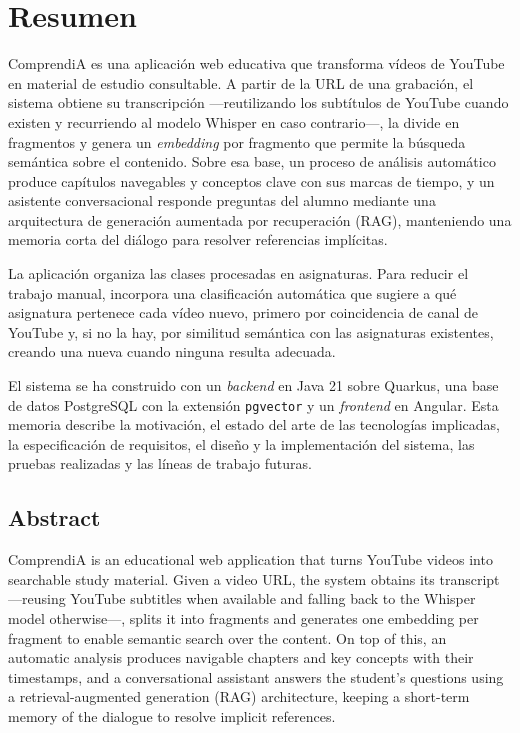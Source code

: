 \cleardoublepage
\chapter*{Resumen}

ComprendiA es una aplicación web educativa que transforma vídeos de YouTube en material
de estudio consultable. A partir de la URL de una grabación, el sistema obtiene su
transcripción —reutilizando los subtítulos de YouTube cuando existen y recurriendo al
modelo Whisper en caso contrario—, la divide en fragmentos y genera un \textit{embedding}
por fragmento que permite la búsqueda semántica sobre el contenido. Sobre esa base, un
proceso de análisis automático produce capítulos navegables y conceptos clave con sus
marcas de tiempo, y un asistente conversacional responde preguntas del alumno mediante una
arquitectura de generación aumentada por recuperación (RAG), manteniendo una memoria corta
del diálogo para resolver referencias implícitas.

La aplicación organiza las clases procesadas en asignaturas. Para reducir el trabajo manual,
incorpora una clasificación automática que sugiere a qué asignatura pertenece cada vídeo
nuevo, primero por coincidencia de canal de YouTube y, si no la hay, por similitud semántica
con las asignaturas existentes, creando una nueva cuando ninguna resulta adecuada.

El sistema se ha construido con un \textit{backend} en Java 21 sobre Quarkus, una base de
datos PostgreSQL con la extensión \texttt{pgvector} y un \textit{frontend} en Angular. Esta
memoria describe la motivación, el estado del arte de las tecnologías implicadas, la
especificación de requisitos, el diseño y la implementación del sistema, las pruebas
realizadas y las líneas de trabajo futuras.

\vspace{1cm}
\section*{Abstract}

ComprendiA is an educational web application that turns YouTube videos into searchable study
material. Given a video URL, the system obtains its transcript —reusing YouTube subtitles when
available and falling back to the Whisper model otherwise—, splits it into fragments and
generates one embedding per fragment to enable semantic search over the content. On top of
this, an automatic analysis produces navigable chapters and key concepts with their
timestamps, and a conversational assistant answers the student's questions using a
retrieval-augmented generation (RAG) architecture, keeping a short-term memory of the dialogue
to resolve implicit references.

